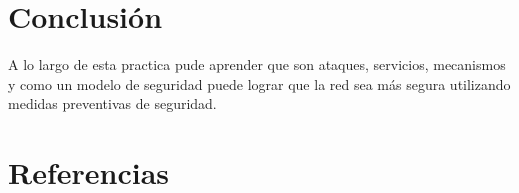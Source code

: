 \documentclass[11pt]{article}
\begin{document}
\section{Conclusión}
\label{sec:org4c0e50b}
A lo largo de esta practica pude aprender que son ataques, servicios, mecanismos 
y como un modelo de seguridad puede lograr que la red sea más segura utilizando 
medidas preventivas de seguridad.


\section{Referencias}
\label{sec:org959170a}
\printbibliography[heading=none]
\end{document}
